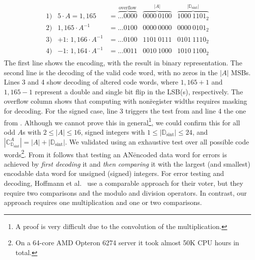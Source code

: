 \vspace{-4mm}
{
	\smaller
	\begin{align}
	\begin{array}{rrlll}
	1) & 5 \cdot A = 1,165 &= \overbrace{\dots0000}^{\text{overflow}} & \overbrace{0000~0100}^{|A|} & \overbrace{1000~1101_2}^{|\mathbb{D}_\text{sint}|} \nonumber \\
	2) & 1,165 \cdot A^{-1} &= \dots0100 & 0000~0000 & 0000~0101_2 \nonumber \\
	3) & +1\text{: }1,166 \cdot A^{-1} &= \dots0100 & 1101~0111 & 0101~1110_2 \\
	4) & -1\text{: }1,164 \cdot A^{-1} &= \dots0011 & 0010~1000 & 1010~1100_2
	\end{array}
	\end{align}
}
The first line shows the encoding, with the result in binary representation. The second line is the decoding of the valid code word, with no zeros in the \(|A|\) MSBs. Lines 3 and 4 show decoding of altered code words, where \(1,165+1\) and \(1,165-1\) represent a double and single bit flip in the LSB(s), respectively. The overflow column shows that computing with non\=register widths requires masking for decoding. For the signed case, line 3 triggers the test from  and line 4 the one from . Although we cannot prove this in general\footnote{A proof is very difficult due to the convolution of the multiplication.}, we could confirm this for all odd \(A\)s with \(2\leq|A|\leq16\), signed integers with \(1\leq|\mathbb{D}_\text{sint}|\leq24\), and \(|\mathbb{C}_{\mathbb{D}_\text{sint}}^A|=|A|+|\mathbb{D}_\text{sint}|\). We validated  using an exhaustive test over all possible code words\footnote{On a 64-core AMD Opteron 6274 server it took almost 50K CPU hours in total.}. From  it follows that testing an AN\=encoded data word for errors is achieved by \emph{first decoding} it and \emph{then comparing} it with the largest (and smallest) encodable data word for unsigned (signed) integers. For error testing and decoding, Hoffmann et al.~\cite{DBLP:conf/hase/HoffmannUDSLS14} use a comparable approach for their voter, but they require two comparisons and the modulo and division operators. In contrast, our approach requires one multiplication and one or two comparisons.
